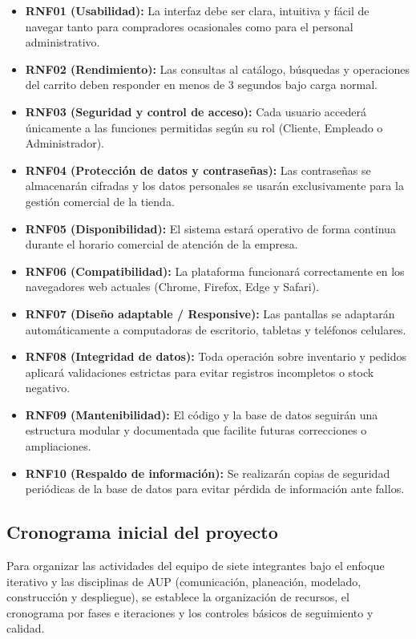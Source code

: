 \begin{itemize}
    \item \textbf{RNF01 (Usabilidad):} La interfaz debe ser clara, intuitiva y fácil de navegar tanto para compradores ocasionales como para el personal administrativo.
    \item \textbf{RNF02 (Rendimiento):} Las consultas al catálogo, búsquedas y operaciones del carrito deben responder en menos de 3 segundos bajo carga normal.
    \item \textbf{RNF03 (Seguridad y control de acceso):} Cada usuario accederá únicamente a las funciones permitidas según su rol (Cliente, Empleado o Administrador).
    \item \textbf{RNF04 (Protección de datos y contraseñas):} Las contraseñas se almacenarán cifradas y los datos personales se usarán exclusivamente para la gestión comercial de la tienda.
    \item \textbf{RNF05 (Disponibilidad):} El sistema estará operativo de forma continua durante el horario comercial de atención de la empresa.
    \item \textbf{RNF06 (Compatibilidad):} La plataforma funcionará correctamente en los navegadores web actuales (Chrome, Firefox, Edge y Safari).
    \item \textbf{RNF07 (Diseño adaptable / Responsive):} Las pantallas se adaptarán automáticamente a computadoras de escritorio, tabletas y teléfonos celulares.
    \item \textbf{RNF08 (Integridad de datos):} Toda operación sobre inventario y pedidos aplicará validaciones estrictas para evitar registros incompletos o stock negativo.
    \item \textbf{RNF09 (Mantenibilidad):} El código y la base de datos seguirán una estructura modular y documentada que facilite futuras correcciones o ampliaciones.
    \item \textbf{RNF10 (Respaldo de información):} Se realizarán copias de seguridad periódicas de la base de datos para evitar pérdida de información ante fallos.
\end{itemize}

\subsection{Cronograma inicial del proyecto}
\label{subsec:cronograma_inicial}
Para organizar las actividades del equipo de siete integrantes bajo el enfoque iterativo y las disciplinas de AUP (comunicación, planeación, modelado, construcción y despliegue), se establece la organización de recursos, el cronograma por fases e iteraciones y los controles básicos de seguimiento y calidad.

